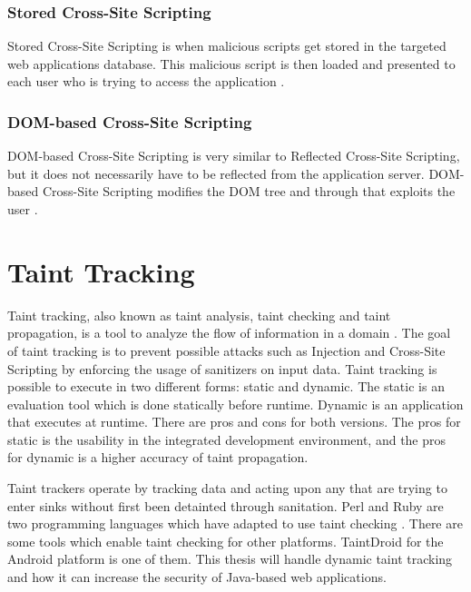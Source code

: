 \subsubsection{Stored Cross-Site Scripting}
Stored Cross-Site Scripting is when malicious scripts get stored in the targeted web applications database. This malicious script is then loaded and presented to each user who is trying to access the application \parencite{Secure_Web}.



\subsubsection{DOM-based Cross-Site Scripting}
DOM-based Cross-Site Scripting is very similar to Reflected Cross-Site Scripting, but it does not necessarily have to be reflected from the application server. DOM-based Cross-Site Scripting modifies the DOM tree and through that exploits the user \parencite{Secure_Web}.



\section{Taint Tracking}
\label{DynamicTaintTracking}
Taint tracking, also known as taint analysis, taint checking and taint propagation, is a tool to analyze the flow of information in a domain \parencite{Pan2015}. The goal of taint tracking is to prevent possible attacks such as Injection and Cross-Site Scripting by enforcing the usage of sanitizers on input data. Taint tracking is possible to execute in two different forms: static and dynamic. The static is an evaluation tool which is done statically before runtime. Dynamic is an application that executes at runtime. There are pros and cons for both versions. The pros for static is the usability in the integrated development environment, and the pros for dynamic is a higher accuracy of taint propagation. 

Taint trackers operate by tracking data and acting upon any that are trying to enter sinks without first been detainted through sanitation. Perl and Ruby are two programming languages which have adapted to use taint checking \parencite{perl, ruby}. There are some tools which enable taint checking for other platforms. TaintDroid \parencite{Ma2010} for the Android platform is one of them. This thesis will handle dynamic taint tracking and how it can increase the security of Java-based web applications.

